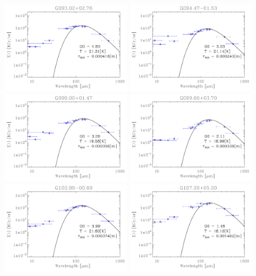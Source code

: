 \begin{figure}
\includegraphics[trim=-1mm -1mm -1mm -1mm, clip, width=55mm]{appB/appB_24.pdf}
\includegraphics[trim=-1mm -1mm -1mm -1mm, clip, width=55mm]{appB/appB_25.pdf}
\includegraphics[trim=-1mm -1mm -1mm -1mm, clip, width=55mm]{appB/appB_26.pdf}
\includegraphics[trim=-1mm -1mm -1mm -1mm, clip, width=55mm]{appB/appB_27.pdf}
\includegraphics[trim=-1mm -1mm -1mm -1mm, clip, width=55mm]{appB/appB_28.pdf}
\includegraphics[trim=-1mm -1mm -1mm -1mm, clip, width=55mm]{appB/appB_29.pdf}

\end{figure}
